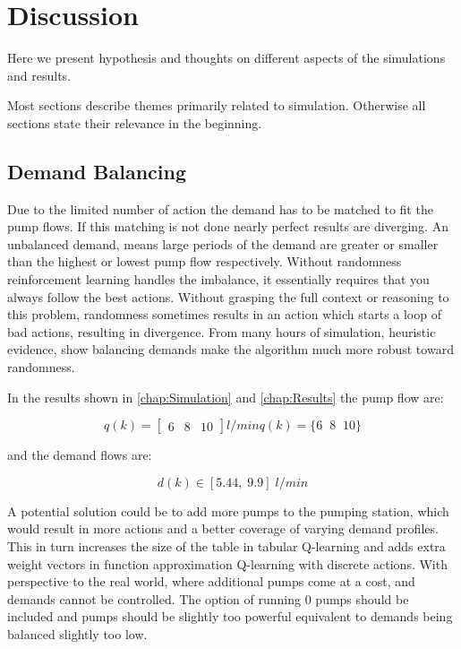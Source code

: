 \chapter{Discussion}\label{chap:Discussion}

Here we present hypothesis and thoughts on different aspects of the simulations and results. 

Most sections describe themes primarily related to simulation. Otherwise all sections state their relevance in the beginning.

\section{Demand Balancing}

Due to the limited number of action the demand has to be matched to fit the pump flows. If this matching is not done nearly perfect results are diverging. An unbalanced demand, means large periods of the demand are greater or smaller than the highest or lowest pump flow respectively. Without randomness reinforcement learning handles the imbalance, it essentially requires that you always follow the best actions. Without grasping the full context or reasoning to this problem, randomness sometimes results in an action which starts a loop of bad actions, resulting in divergence. From many hours of simulation, heuristic evidence, show balancing demands make the algorithm much more robust toward randomness.

In the results shown in \cref{chap:Simulation} and \cref{chap:Results} the pump flow are:

\begin{equation*}
	q(k)=
	\begin{bmatrix}
		6 &  8 & 10
	\end{bmatrix}l/min
q(k)=\{6\;\; 8 \;\; 10\}
\end{equation*}

and the demand flows are:

\begin{equation*}
	d(k)\in [5.44,\; 9.9] \; l/min
\end{equation*}


 A potential solution could be to add more pumps to the pumping station, which would result in more actions and a better coverage of varying demand profiles. This in turn increases the size of the table in tabular Q-learning and adds extra weight vectors in function approximation Q-learning with discrete actions. 
With perspective to the real world, where additional pumps come at a cost, and demands cannot be controlled. The option of running 0 pumps should be included and pumps should be slightly too powerful equivalent to demands being balanced slightly too low.

